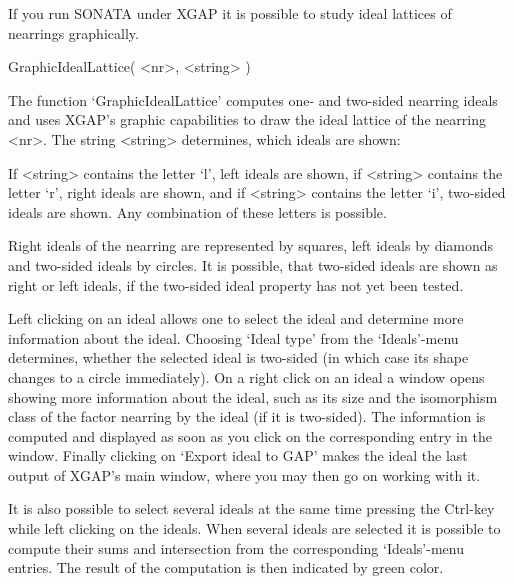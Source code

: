 %
%

If you run SONATA under XGAP it is possible to study ideal lattices of
nearrings graphically.

\>GraphicIdealLattice( <nr>, <string> )

The function `GraphicIdealLattice' computes one- and two-sided
nearring ideals and uses XGAP's graphic capabilities to draw the ideal
lattice of the nearring <nr>. The string <string> determines, which
ideals are shown:

If <string> contains the letter `l', left ideals are shown, if
<string> contains the letter `r', right ideals are shown, and if
<string> contains the letter `i', two-sided ideals are shown.  Any
combination of these letters is possible.

Right ideals of the nearring are represented by squares, left ideals
by diamonds and two-sided ideals by circles. It is possible, that
two-sided ideals are shown as right or left ideals, if the two-sided
ideal property has not yet been tested.

Left clicking on an ideal allows one to select the ideal and determine
more information about the ideal. Choosing `Ideal type' from the
`Ideals'-menu determines, whether the selected ideal is two-sided (in
which case its shape changes to a circle immediately). On a right
click on an ideal a window opens showing more information about the
ideal, such as its size and the isomorphism class of the factor
nearring by the ideal (if it is two-sided). The information is
computed and displayed as soon as you click on the corresponding entry
in the window. Finally clicking on `Export ideal to GAP' makes the
ideal the last output of XGAP's main window, where you may then go on
working with it.

It is also possible to select several ideals at the same time pressing
the Ctrl-key while left clicking on the ideals. When several ideals
are selected it is possible to compute their sums and intersection
from the corresponding `Ideals'-menu entries. The result of the
computation is then indicated by green color.

